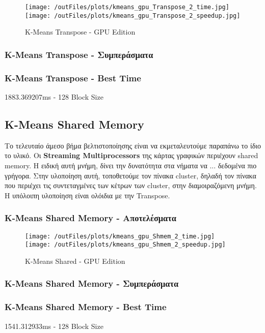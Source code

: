 \documentclass[../final_report.tex]{subfiles}
\begin{document}
\begin{figure}[H]
    \centering
    \texttt{[image: /outFiles/plots/kmeans\_gpu\_Transpose\_2\_time.jpg]}
    \texttt{[image: /outFiles/plots/kmeans\_gpu\_Transpose\_2\_speedup.jpg]}
    \caption{K-Means Transpose - GPU Edition}
    \label{fig:K-Means Transpose - GPU Edition}
\end{figure}

\subsubsection*{K-Means Transpose - Συμπεράσματα}

\subsubsection*{K-Means Transpose - Best Time}
1883.369207ms - 128 Block Size


\subsection{K-Means Shared Memory}
Το τελευταίο άμεσο βήμα βελτιστοποίησης είναι να εκμεταλευτούμε παραπάνω το ίδιο το υλικό. Οι \textbf{Streaming Multiprocessors} της κάρτας
γραφικών περιέχουν shared memory. Η ειδική αυτή μνήμη, δίνει την δυνατότητα στα νήματα να ... δεδομένα πιο γρήγορα. Στην υλοποίηση αυτή, τοποθετούμε
τον πίνακα cluster, δηλαδή τον πίνακα που περιέχει τις συντεταγμένες των κέτρων των cluster, στην διαμοιραζόμενη μνήμη. Η υπόλοιπη υλοποίηση
είναι ολόιδια με την Transpose.

\subsubsection*{K-Means Shared Memory - Αποτελέσματα}

\begin{figure}[H]
    \centering
    \texttt{[image: /outFiles/plots/kmeans\_gpu\_Shmem\_2\_time.jpg]}
    \texttt{[image: /outFiles/plots/kmeans\_gpu\_Shmem\_2\_speedup.jpg]}
    \caption{K-Means Shared - GPU Edition}
    \label{fig:K-Means Shared - GPU Edition}
\end{figure}

\subsubsection*{K-Means Shared Memory - Συμπεράσματα}

\subsubsection*{K-Means Shared Memory - Best Time}
1541.312933ms - 128 Block Size
\end{document}
